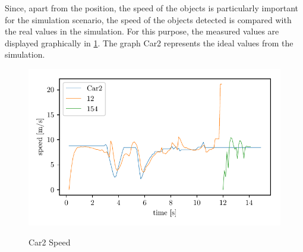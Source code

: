 \documentclass[11pt,oneside,openright]{mpreport}
\begin{document}

Since, apart from the position, the speed of the objects is particularly important for the simulation scenario, the speed of the objects detected is compared with the real values in the simulation.
For this purpose, the measured values are displayed graphically in \cref{car2_speed}. The graph Car2 represents the ideal values from the simulation.

\begin{figure}[!htb]
  \caption{Car2 Speed} 
  \centering
  \includegraphics[width=\textwidth]{bilder/Car2_speed.pdf}
 \label{car2_speed}
\end{figure}

\end{document}
